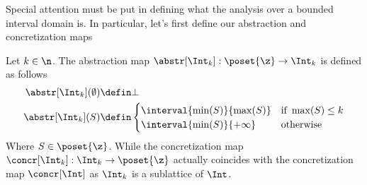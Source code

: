 \medskip

\noindent
Special attention must be put in defining what the analysis over a
bounded interval domain is. In particular, let's first define our
abstraction and concretization maps

\begin{definition}\label{def:boundedac}
  Let \(k\in\n\). The abstraction map
  \({\abstr[\Int_k] : \poset{\z} \to \Int_k}\) is defined as follows
  \begin{align*}
    \abstr[\Int_k](\emptyset) & \defin \bot \\
    \abstr[\Int_k](S) & \defin \begin{cases}
      \interval{\min(S)}{\max(S)} & \text{if } \max(S) \leq k \\
      \interval{\min(S)}{+\infty} & \text{otherwise}
    \end{cases}
  \end{align*}
  Where \(S\in\poset{\z}\). While the concretization map
  \({\concr[\Int_k] : \Int_k \to \poset{\z}}\) actually coincides with
  the concretization map \(\concr[\Int]\) as \(\Int_k\) is a
  sublattice of \(\Int\).
\end{definition}


